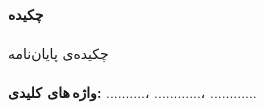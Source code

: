 
\large \textbf{چکیده}

\paragraph*{}
چکیده‌ی پایان‌نامه
\paragraph*{}
\textbf{واژه\,های کلیدی:}
..........، ............، ............
